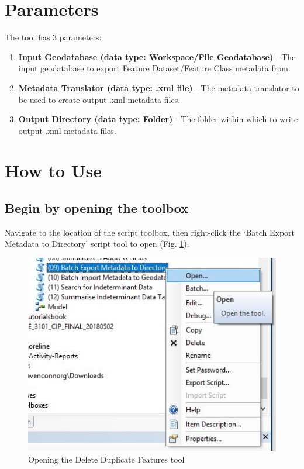\documentclass[openany]{book}
\theoremstyle{definition}
\theoremstyle{definition}
\theoremstyle{definition}
\theoremstyle{remark}
\begin{document}
\section{Parameters}\label{parameters-10}

The tool has 3 parameters:

\begin{enumerate}
\def\labelenumi{\arabic{enumi}.}
\item
  \textbf{Input Geodatabase (data type: Workspace/File Geodatabase)} -
  The input geodatabase to export Feature Dataset/Feature Class metadata
  from.
\item
  \textbf{Metadata Translator (data type: .xml file)} - The metadata
  translator to be used to create output .xml metadata files.
\item
  \textbf{Output Directory (data type: Folder)} - The folder within
  which to write output .xml metadata files.
\end{enumerate}

\section{How to Use}\label{how-to-use-10}

\subsection{Begin by opening the
toolbox}\label{begin-by-opening-the-toolbox-10}

Navigate to the location of the script toolbox, then right-click the
`Batch Export Metadata to Directory' script tool to open (Fig.
\ref{fig:imMetaopen}).

\begin{figure}[H]

{\centering \includegraphics{figures/exMeta-open} 

}

\caption{Opening the Delete Duplicate Features tool}\label{fig:imMetaopen}
\end{figure}
\end{document}
